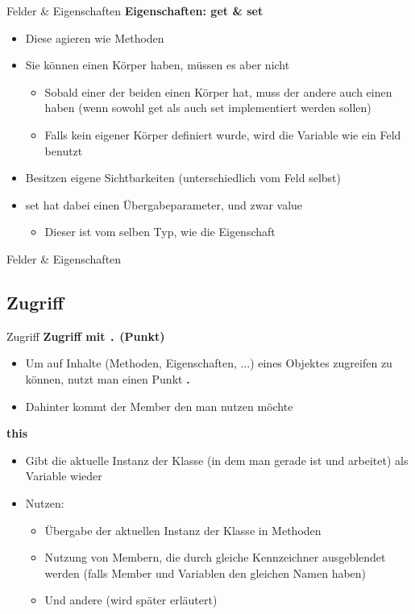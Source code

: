 \begin{frame}{Felder \& Eigenschaften}
	\textbf{Eigenschaften: get \& set}
	\begin{itemize}
		\item Diese agieren wie Methoden
		\item Sie können einen Körper haben, müssen es aber nicht
		\begin{itemize}
			\item Sobald einer der beiden einen Körper hat, muss der andere auch einen haben (wenn sowohl \alert{get} als auch \alert{set} implementiert werden sollen)
			\item Falls kein eigener Körper definiert wurde, wird die Variable wie ein Feld benutzt
		\end{itemize}
		\item Besitzen eigene Sichtbarkeiten (unterschiedlich vom Feld selbst)
		\item \alert{set} hat dabei einen Übergabeparameter, und zwar \alert{value}
		\begin{itemize}
			\item Dieser ist vom selben Typ, wie die Eigenschaft		
		\end{itemize}		
	\end{itemize}
\end{frame}

\begin{frame}{Felder \& Eigenschaften}	
	
\end{frame}

\subsection{Zugriff}
\begin{frame}{Zugriff}
	\textbf{Zugriff mit \texttt{\alert{.}} (Punkt)}\\
	\begin{itemize}
		\item Um auf Inhalte (Methoden, Eigenschaften, ...) eines Objektes zugreifen zu können, nutzt man einen Punkt \alert{\textbf{.}}
		\item Dahinter kommt der Member den man nutzen möchte
	\end{itemize}
	\textbf{this}\\
	\begin{itemize}
		\item Gibt die aktuelle Instanz der Klasse (in dem man gerade ist und arbeitet) als Variable wieder
		\item Nutzen:
		\begin{itemize}
			\item Übergabe der aktuellen Instanz der Klasse in Methoden
			\item Nutzung von Membern, die durch gleiche Kennzeichner ausgeblendet werden (falls Member und Variablen den gleichen Namen haben)
			\item Und andere (wird später erläutert)
		\end{itemize}
	\end{itemize}
\end{frame}

